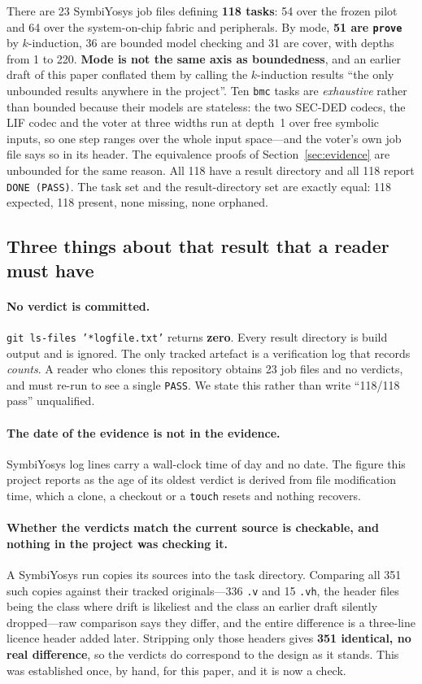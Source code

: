 \documentclass[11pt,a4paper]{article}
\begin{document}
There are 23 SymbiYosys job files defining \textbf{118 tasks}: 54 over
the frozen pilot and 64 over the system-on-chip fabric and peripherals.
By mode, \textbf{51 are \texttt{prove}} by $k$-induction, 36 are bounded
model checking and 31 are cover, with depths from 1 to 220.
\textbf{Mode is not the same axis as boundedness}, and an earlier draft
of this paper conflated them by calling the $k$-induction results ``the
only unbounded results anywhere in the project''. Ten \texttt{bmc} tasks
are \emph{exhaustive} rather than bounded because their models are
stateless: the two SEC-DED codecs, the LIF codec and the voter at three
widths run at depth~1 over free symbolic inputs, so one step ranges over
the whole input space---and the voter's own job file says so in its
header. The equivalence proofs of Section~\ref{sec:evidence} are
unbounded for the same reason. All 118 have a
result directory and all 118 report \texttt{DONE (PASS)}. The task set
and the result-directory set are exactly equal: 118 expected, 118
present, none missing, none orphaned.

\subsection{Three things about that result that a reader must have}

\paragraph{No verdict is committed.}
\texttt{git ls-files '*logfile.txt'} returns \textbf{zero}. Every result
directory is build output and is ignored. The only tracked artefact is a
verification log that records \emph{counts}. A reader who clones this
repository obtains 23 job files and no verdicts, and must re-run to see a
single \texttt{PASS}. We state this rather than write ``118/118 pass''
unqualified.

\paragraph{The date of the evidence is not in the evidence.}
SymbiYosys log lines carry a wall-clock time of day and no date. The
figure this project reports as the age of its oldest verdict is derived
from file modification time, which a clone, a checkout or a \texttt{touch}
resets and nothing recovers.

\paragraph{Whether the verdicts match the current source is checkable,
and nothing in the project was checking it.}
A SymbiYosys run copies its sources into the task directory. Comparing
all 351 such copies against their tracked originals---336 \texttt{.v} and
15 \texttt{.vh}, the header files being the class where drift is
likeliest and the class an earlier draft silently dropped---raw
comparison says they differ, and the entire difference is a three-line
licence header added later. Stripping only those headers gives
\textbf{351 identical, no real difference}, so the verdicts do correspond to the design as it
stands. This was established once, by hand, for this paper, and it is now a
check.
\end{document}
